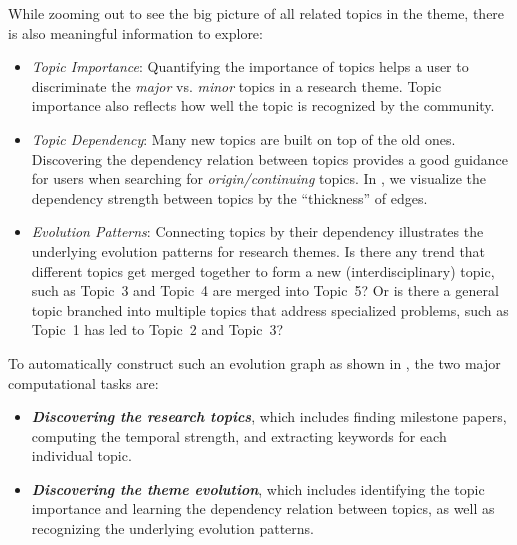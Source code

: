 While zooming out to see the big picture of all related topics in the theme,
there is also meaningful information to explore:
\begin{itemize}
\item  \emph{Topic Importance}: Quantifying the importance of topics helps a
  user to discriminate the \emph{major} vs. \emph{minor} topics in a research
  theme. Topic importance also reflects how well the topic is recognized by the
  community.
\item \emph{Topic Dependency}: Many new topics are built on top of the old ones.
  Discovering the dependency relation between topics provides a good guidance
  for users when searching for \emph{origin/continuing} topics. In
  , we visualize the dependency strength between topics by the
  ``thickness'' of edges.
\item \emph{Evolution Patterns}: Connecting topics by their dependency
  illustrates the underlying evolution patterns for research themes. Is there
  any trend that different topics get merged together to form a new
  (interdisciplinary) topic, such as Topic~3 and Topic~4 are merged into
  Topic~5? Or is there a general topic branched into multiple topics that
  address specialized problems, such as Topic~1 has led to Topic~2 and Topic~3?
\end{itemize}

To automatically construct such an evolution graph as shown in ,
the two major computational tasks are:
\begin{itemize}
\item \textbf{\emph{Discovering the research topics}}, which includes finding
  milestone papers, computing the temporal strength, and extracting keywords for
  each individual topic.
\item \textbf{\emph{Discovering the theme evolution}}, which includes
  identifying the topic importance and learning the dependency relation between
  topics, as well as recognizing the underlying evolution patterns.
\end{itemize}

